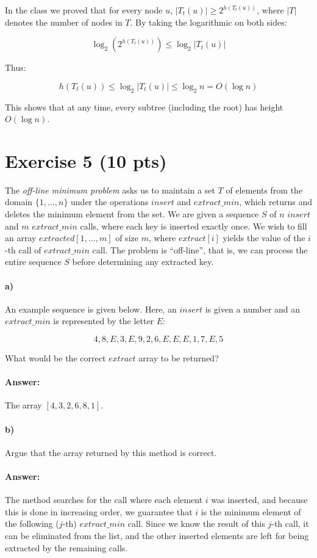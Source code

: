 \documentclass[a4paper]{article}
\begin{document}
In the class we proved that for every node $u$, $|T_t(u)| \ge 2^{h(T_t(u))}$, where $|T|$ denotes the number of nodes in $T$. By taking the logarithmic on both sides:

$$\log_2 (2^{h(T_t(u))}) \le \log_2 |T_t(u)|$$

Thus:

$$h(T_t(u)) \le \log_2 |T_t(u)| \le \log_2 n = O(\log n)$$

This shows that at any time, every subtree (including the root) has height $O(\log n)$.

\section{Exercise 5 (10 pts)}

The \emph{off-line minimum problem} asks us to maintain a set $T$ of elements from the domain $\{1, \ldots, n\}$ under the operations $insert$ and $extract\_min$, which returns and deletes the minimum element from the set. We are given a sequence $S$ of $n$ $insert$ and $m$ $extract\_min$ calls, where each key is inserted exactly once. We wish to fill an array $extracted[1,\ldots, m]$ of size $m$, where $extract[i]$ yields the value of the $i$-th call of $extract\_min$ call. The problem is ``off-line'', that is, we can process the entire sequence $S$ before determining any extracted key.

\paragraph{a)} An example sequence is given below. Here, an $insert$ is given a number and an $extract\_min$ is represented by the letter $E$:

$$4,8,E,3,E,9,2,6,E,E,E,1,7,E,5$$

What would be the correct $extract$ array to be returned?

\paragraph{Answer:} The array $[4, 3, 2, 6, 8, 1]$.

\paragraph{b)} Argue that the array returned by this method is correct.

\paragraph{Answer:} The method searches for the call where each element $i$ was inserted, and because this is done in increasing order, we guarantee that $i$ is the minimum element of the following ($j$-th) $extract\_min$ call. Since we know the result of this $j$-th call, it can be eliminated from the list, and the other inserted elements are left for being extracted by the remaining calls.
\end{document}
